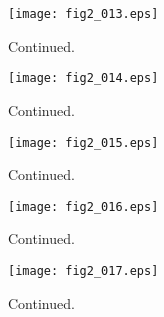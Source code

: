 \documentclass[preprint]{aastex}
\begin{document}
\setcounter{figure}{1}
\begin{figure}[t]
\centering
\texttt{[image: fig2\_013.eps]}
\caption{
Continued. 
}
\label{Fig2}
\end{figure}
\clearpage



\setcounter{figure}{1}
\begin{figure}[t]
\centering
\texttt{[image: fig2\_014.eps]}
\caption{
Continued. 
}
\label{Fig2}
\end{figure}
\clearpage



\setcounter{figure}{1}
\begin{figure}[t]
\centering
\texttt{[image: fig2\_015.eps]}
\caption{
Continued. 
}
\label{Fig2}
\end{figure}
\clearpage



\setcounter{figure}{1}
\begin{figure}[t]
\centering
\texttt{[image: fig2\_016.eps]}
\caption{
Continued. 
}
\label{Fig2}
\end{figure}
\clearpage



\setcounter{figure}{1}
\begin{figure}[t]
\centering
\texttt{[image: fig2\_017.eps]}
\caption{
Continued. 
}
\label{Fig2}
\end{figure}
\clearpage
\end{document}
